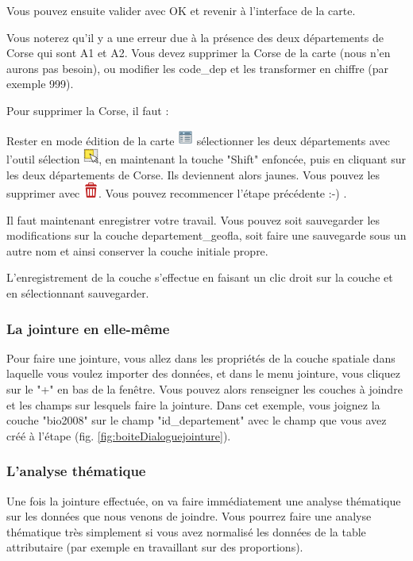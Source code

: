 \documentclass[a4paper, 11pt]{article}
\begin{document}
  Vous pouvez ensuite valider avec OK et revenir à l'interface de la carte.

  Vous noterez qu'il y a une erreur due à la présence des deux départements de Corse qui sont A1 et A2. Vous devez supprimer la Corse de la carte (nous n'en aurons pas besoin), ou modifier les code\_dep et les transformer en chiffre (par exemple 999).

  Pour supprimer la Corse, il faut :

  Rester en mode édition de la carte \includegraphics[width=0.5cm]{img/mActionOpenTable}  sélectionner les deux départements avec l’outil sélection \includegraphics[width=0.5cm]{img/mActionSelectRectangle}, en maintenant la touche "Shift" enfoncée, puis en cliquant sur les deux départements de Corse. Ils deviennent alors jaunes. Vous pouvez les supprimer avec \includegraphics[width=0.5cm]{img/mActionDeleteSelected}. Vous pouvez recommencer l'étape précédente :-) .

  Il faut maintenant enregistrer votre travail. Vous pouvez soit sauvegarder les modifications sur la couche departement\_geofla, soit faire une sauvegarde sous un autre nom et ainsi conserver la couche initiale propre.

  L'enregistrement de la couche s'effectue en faisant un clic droit sur la couche et en sélectionnant sauvegarder.

  \subsubsection{La jointure en elle-même}

  Pour faire une jointure, vous allez dans les propriétés de la couche spatiale dans laquelle vous voulez importer des données, et dans le menu jointure, vous cliquez sur le "+" en bas de la fenêtre. Vous pouvez alors renseigner les couches à joindre et les champs sur lesquels faire la jointure. Dans cet exemple, vous joignez la couche "bio2008" sur le champ "id\_departement" avec le champ que vous avez créé à l'étape (fig. \ref{fig:boiteDialoguejointure}).

  \subsubsection{L'analyse thématique}
  Une fois la jointure effectuée, on va faire immédiatement une analyse thématique sur les données que nous venons de joindre. Vous pourrez faire une analyse thématique très simplement si vous avez normalisé les données de la table attributaire (par exemple en travaillant sur des proportions).
\end{document}
